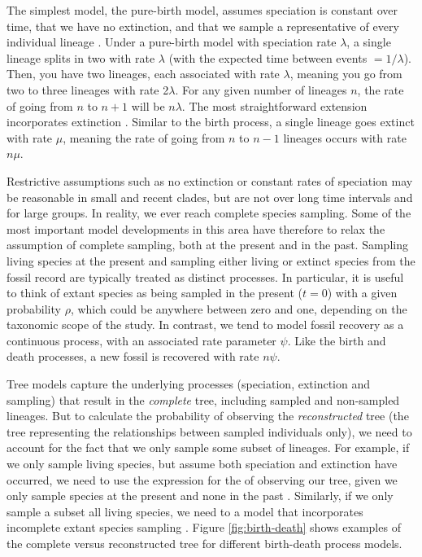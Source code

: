 The simplest model, the pure-birth model, assumes speciation is constant over time, that we have no extinction, and that we sample a representative of every individual lineage \citep{Yule1925}.
Under a pure-birth model with speciation rate $\lambda$, a single lineage splits in two with rate $\lambda$ (with the expected time between events $=1/\lambda$). Then, you have two lineages, each associated with rate $\lambda$, meaning you go from two to three lineages with rate 2$\lambda$. For any given number of lineages $n$, the rate of going from $n$ to $n+1$ will be $n\lambda$.
The most straightforward extension incorporates  extinction \citep{Kendall1948}.
Similar to the birth process, a single lineage goes extinct with rate $\mu$, meaning the rate of going from $n$ to $n-1$ lineages occurs with rate $n\mu$.

Restrictive assumptions such as no extinction or constant rates of speciation may be reasonable in small and recent clades, but are not  over long time intervals and for large groups.
In reality, we  ever reach complete species sampling.
Some of the most important model developments in this area have therefore  to relax the assumption of complete sampling, both at the present and in the past.
Sampling living species at the present and sampling either living or extinct species from the fossil record are typically treated as distinct processes.
In particular, it is useful to think of extant species as being sampled in the present ($t=0$) with a given probability $\rho$, which could be anywhere between zero and one, depending on the taxonomic scope of the study.
In contrast, we tend to model fossil recovery as a continuous process, with an associated rate parameter $\psi$. Like the birth and death processes, a new fossil is recovered with rate $n\psi$.

Tree models capture the underlying processes (speciation, extinction and sampling) that result in the \textit{complete} tree, including sampled and non-sampled lineages. But to calculate the probability of observing the  \textit{reconstructed} tree (the tree representing the relationships between sampled individuals only), we need to account for the fact that we only sample some subset of lineages.
For example, if we only sample living species, but assume both speciation and extinction have occurred, we need to use the expression for the  of observing our tree, given we only sample species at the present and none in the past \citep{Thompson1975,Gernhard2008, Stadler2009}.  Similarly, if we only sample a subset  all living species, we need to  a model that incorporates incomplete extant species sampling \citep{Yang1997,Stadler2009}.
Figure \ref{fig:birth-death} shows examples of the complete versus  reconstructed tree for different birth-death process models.


